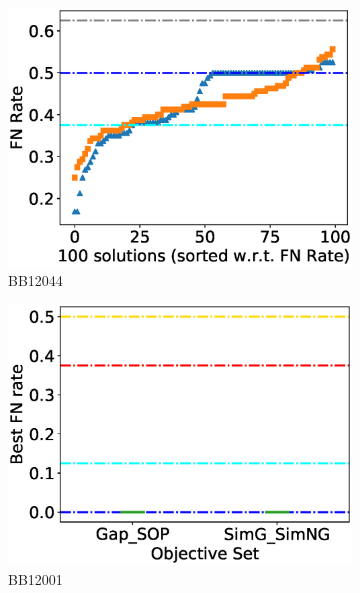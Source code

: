 \begin{figure}[!htbp]
\begin{adjustwidth}{-1cm}{-1cm}
\begin{subfigure}{0.22\textwidth}
			\includegraphics[width=\columnwidth]{Figure/summary/precomputedInit/Balibase/BB12044_fnrate_density_single_run}
			\caption{BB12044}
		\end{subfigure}
		\begin{subfigure}{0.22\textwidth}
			\includegraphics[width=\columnwidth]{Figure/summary/precomputedInit/Balibase/BB12001_objset_fnrate_rank}
			\caption{BB12001}
		\end{subfigure}	
		\begin{subfigure}{0.22\textwidth}

\end{subfigure}
\end{adjustwidth}
\end{figure}
